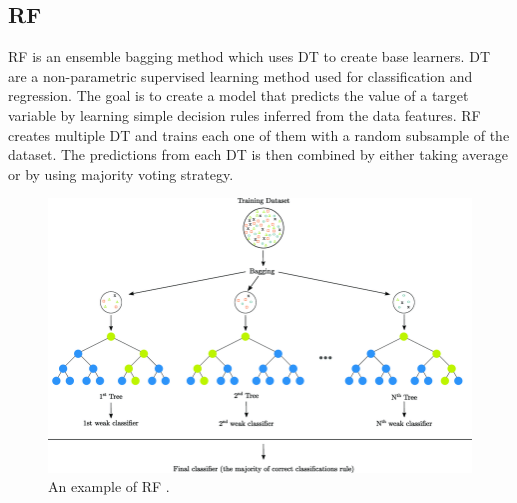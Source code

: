 \documentclass[twoside,11pt,a4paper]{article}
\begin{document}
\subsection{\acf{RF}}
\acf{RF} \citep{breiman2001random} is an ensemble bagging method which uses \acf{DT} to create base learners. \acs{DT} are a non-parametric supervised learning method used for classification and regression. The goal is to create a model that predicts the value of a target variable by learning simple decision rules inferred from the data features. \acs{RF} creates multiple \acs{DT} and trains each one of them with a random subsample of the dataset. The predictions from each \acs{DT} is then combined by either taking average or by using majority voting strategy.\\
\begin{figure}[ht]
	\centering
	\includegraphics[width=1\textwidth]{random_forest}
	\caption[An example \acs{RF}. ]{An example of \acf{RF} \cite{sapountzoglou2020fault}.}
	\label{fig:random_forest}
\end{figure}
\FloatBarrier
\end{document}
